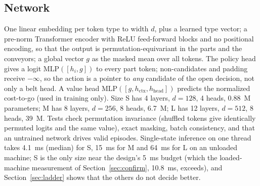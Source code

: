 \documentclass[11pt,a4paper]{article}
\theoremstyle{plain}
\theoremstyle{definition}
\theoremstyle{remark}
\begin{document}
\subsection{Network}
One linear embedding per token type to width $d$, plus a learned type vector; a pre-norm
Transformer encoder with ReLU feed-forward blocks and no positional encoding, so that the
output is permutation-equivariant in the parts and the conveyors; a global vector $g$ as
the masked mean over all tokens. The policy head gives a logit $\mathrm{MLP}([h_i,g])$ to
every part token; non-candidates and padding receive $-\infty$, so the action is a
pointer to \emph{any} candidate of the open decision, not only a belt head. A value head
$\mathrm{MLP}([g,h_{\mathrm{ctx}},h_{\mathrm{head}}])$ predicts the normalized cost-to-go
(used in training only). Size S has 4 layers, $d=128$, 4 heads, 0.88~M parameters; M
has 8 layers, $d=256$, 8 heads, 6.7~M; L has 12 layers, $d=512$, 8 heads, 39~M. Tests
check permutation invariance (shuffled tokens give identically permuted logits and the
same value), exact masking, batch consistency, and that an untrained network drives valid
episodes. Single-state inference on one thread takes 4.1~ms (median) for S, 15~ms for M
and 64~ms for L on an unloaded machine; S is the only size near the design's 5~ms
budget (which the loaded-machine measurement of Section~\ref{sec:confirm}, 10.8~ms,
exceeds), and Section~\ref{sec:ladder} shows that the others do not decide better.
\end{document}
